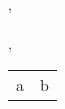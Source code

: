 \begin{titlepage}
\begin{center}


\\[1.0cm]
\textsc{\LARGE{\reportCompany}}
\\[1.5cm]

\textsc{\Large\reportSubtitle}
\\[0.5cm]

\sep
\\[0.4cm]
{\huge{\bfseries{\reportTitle}}
\\[0.4cm]}
\sep

\begin{tabular}{lr}
    a & b
\end{tabular}\\
\vfill

{\large{\reportDate}}

\end{center}
\end{titlepage}
